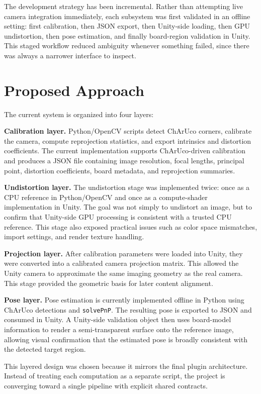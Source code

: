 \documentclass[10pt,twocolumn,letterpaper]{article}
\begin{document}
The development strategy has been incremental. Rather than attempting live camera integration immediately, each subsystem was first validated in an offline setting: first calibration, then JSON export, then Unity-side loading, then GPU undistortion, then pose estimation, and finally board-region validation in Unity. This staged workflow reduced ambiguity whenever something failed, since there was always a narrower interface to inspect.

\section{Proposed Approach}

The current system is organized into four layers:

\textbf{Calibration layer.}
Python/OpenCV scripts detect ChArUco corners, calibrate the camera, compute reprojection statistics, and export intrinsics and distortion coefficients. The current implementation supports ChArUco-driven calibration and produces a JSON file containing image resolution, focal lengths, principal point, distortion coefficients, board metadata, and reprojection summaries.

\textbf{Undistortion layer.}
The undistortion stage was implemented twice: once as a CPU reference in Python/OpenCV and once as a compute-shader implementation in Unity. The goal was not simply to undistort an image, but to confirm that Unity-side GPU processing is consistent with a trusted CPU reference. This stage also exposed practical issues such as color space mismatches, import settings, and render texture handling.

\textbf{Projection layer.}
After calibration parameters were loaded into Unity, they were converted into a calibrated camera projection matrix. This allowed the Unity camera to approximate the same imaging geometry as the real camera. This stage provided the geometric basis for later content alignment.

\textbf{Pose layer.}
Pose estimation is currently implemented offline in Python using ChArUco detections and \texttt{solvePnP}. The resulting pose is exported to JSON and consumed in Unity. A Unity-side validation object then uses board-model information to render a semi-transparent surface onto the reference image, allowing visual confirmation that the estimated pose is broadly consistent with the detected target region.

This layered design was chosen because it mirrors the final plugin architecture. Instead of treating each computation as a separate script, the project is converging toward a single pipeline with explicit shared contracts.
\end{document}
